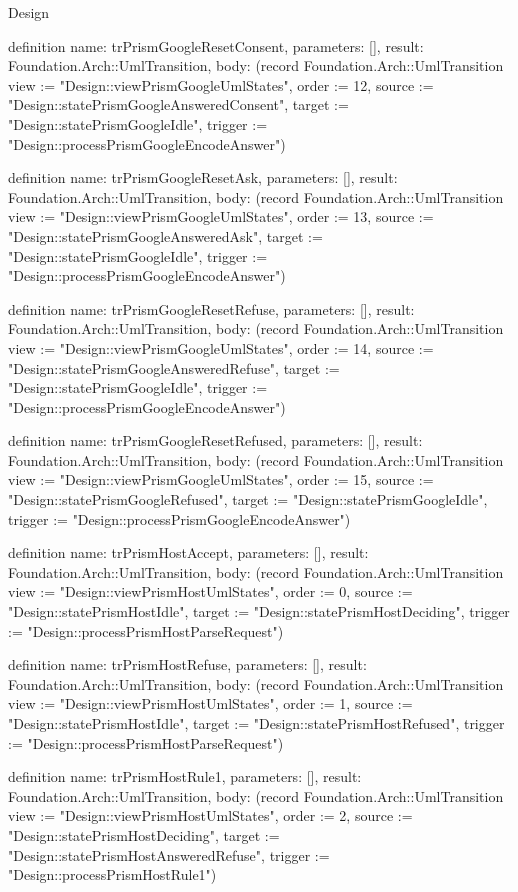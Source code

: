 \begin{lexlean}{Design}
\begin{semanticmodule}
definition{
  name: trPrismGoogleResetConsent,
  parameters: [],
  result: Foundation.Arch::UmlTransition,
  body: (record Foundation.Arch::UmlTransition {view := "Design::viewPrismGoogleUmlStates", order := 12, source := "Design::statePrismGoogleAnsweredConsent", target := "Design::statePrismGoogleIdle", trigger := "Design::processPrismGoogleEncodeAnswer"})
}

definition{
  name: trPrismGoogleResetAsk,
  parameters: [],
  result: Foundation.Arch::UmlTransition,
  body: (record Foundation.Arch::UmlTransition {view := "Design::viewPrismGoogleUmlStates", order := 13, source := "Design::statePrismGoogleAnsweredAsk", target := "Design::statePrismGoogleIdle", trigger := "Design::processPrismGoogleEncodeAnswer"})
}

definition{
  name: trPrismGoogleResetRefuse,
  parameters: [],
  result: Foundation.Arch::UmlTransition,
  body: (record Foundation.Arch::UmlTransition {view := "Design::viewPrismGoogleUmlStates", order := 14, source := "Design::statePrismGoogleAnsweredRefuse", target := "Design::statePrismGoogleIdle", trigger := "Design::processPrismGoogleEncodeAnswer"})
}

definition{
  name: trPrismGoogleResetRefused,
  parameters: [],
  result: Foundation.Arch::UmlTransition,
  body: (record Foundation.Arch::UmlTransition {view := "Design::viewPrismGoogleUmlStates", order := 15, source := "Design::statePrismGoogleRefused", target := "Design::statePrismGoogleIdle", trigger := "Design::processPrismGoogleEncodeAnswer"})
}

definition{
  name: trPrismHostAccept,
  parameters: [],
  result: Foundation.Arch::UmlTransition,
  body: (record Foundation.Arch::UmlTransition {view := "Design::viewPrismHostUmlStates", order := 0, source := "Design::statePrismHostIdle", target := "Design::statePrismHostDeciding", trigger := "Design::processPrismHostParseRequest"})
}

definition{
  name: trPrismHostRefuse,
  parameters: [],
  result: Foundation.Arch::UmlTransition,
  body: (record Foundation.Arch::UmlTransition {view := "Design::viewPrismHostUmlStates", order := 1, source := "Design::statePrismHostIdle", target := "Design::statePrismHostRefused", trigger := "Design::processPrismHostParseRequest"})
}

definition{
  name: trPrismHostRule1,
  parameters: [],
  result: Foundation.Arch::UmlTransition,
  body: (record Foundation.Arch::UmlTransition {view := "Design::viewPrismHostUmlStates", order := 2, source := "Design::statePrismHostDeciding", target := "Design::statePrismHostAnsweredRefuse", trigger := "Design::processPrismHostRule1"})
}


\end{semanticmodule}
\end{lexlean}

